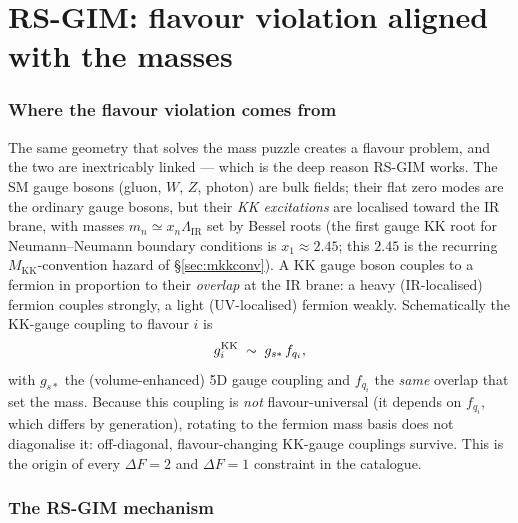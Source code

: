 \documentclass[11pt]{article}
\newcommand{\MKK}{M_{\mathrm{KK}}}
\newcommand{\LIR}{\Lambda_{\mathrm{IR}}}
\newcommand{\gss}{g_{s*}}
\theoremstyle{definition}
\begin{document}
\part{RS-GIM: flavour violation aligned with the masses}
\label{part:rsgim}

\section{Where the flavour violation comes from}
\label{sec:fcnc}

The same geometry that solves the mass puzzle creates a flavour problem, and the
two are inextricably linked --- which is the deep reason RS-GIM works. The SM gauge
bosons (gluon, $W$, $Z$, photon) are bulk fields; their flat zero modes are the
ordinary gauge bosons, but their \emph{KK excitations} are localised toward the IR
brane, with masses $m_n\simeq x_n\LIR$ set by Bessel roots (the first gauge KK root
for Neumann--Neumann boundary conditions is $x_1\approx2.45$; this $2.45$ is the
recurring $\MKK$-convention hazard of \S\ref{sec:mkkconv}). A KK gauge boson
couples to a fermion in proportion to their \emph{overlap} at the IR brane: a
heavy (IR-localised) fermion couples strongly, a light (UV-localised) fermion
weakly. Schematically the KK-gauge coupling to flavour $i$ is
\begin{equation}
g^{\rm KK}_{i}\;\sim\;\gss\,f_{q_i},
\label{eq:gKK}
\end{equation}
with $\gss$ the (volume-enhanced) 5D gauge coupling and $f_{q_i}$ the \emph{same}
overlap that set the mass. Because this coupling is \emph{not} flavour-universal
(it depends on $f_{q_i}$, which differs by generation), rotating to the fermion
mass basis does not diagonalise it: off-diagonal, flavour-changing KK-gauge
couplings survive. This is the origin of every $\Delta F=2$ and $\Delta F=1$
constraint in the catalogue.

\section{The RS-GIM mechanism}
\label{sec:rsgimmech}
\end{document}
